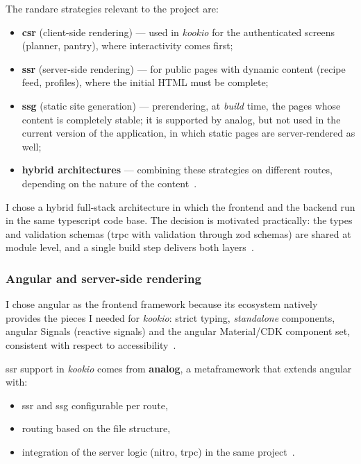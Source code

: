 The \gls{randare} strategies relevant to the project are:
\begin{itemize}
  \item \textbf{\acrshort{csr}} (client-side rendering) --- used in \textit{\gls{kookio}} for the authenticated screens (planner, pantry), where interactivity comes first;
  \item \textbf{\acrshort{ssr}} (server-side rendering) --- for public pages with dynamic content (recipe feed, profiles), where the initial HTML must be complete;
  \item \textbf{\acrshort{ssg}} (static site generation) --- prerendering, at \textit{build} time, the pages whose content is completely stable; it is supported by \gls{analog}, but not used in the current version of the application, in which static pages are server-rendered as well;
  \item \textbf{hybrid architectures} --- combining these strategies on different routes, depending on the nature of the content~\cite{analog}.
\end{itemize}

I chose a hybrid full-stack architecture in which the frontend and the backend run in the same \gls{typescript} code base.
The decision is motivated practically: the types and validation schemas (\gls{trpc} with validation through \gls{zod} schemas) are shared at module level, and a single build step delivers both layers~\cite{trpc,zod}.

\subsubsection{Angular and server-side rendering}\label{subsec:angular-ssr}

I chose \gls{angular} as the frontend framework because its ecosystem natively provides the pieces I needed for \textit{\gls{kookio}}: strict typing, \textit{standalone} components, \gls{angular} Signals (reactive signals) and the \gls{angular} Material/CDK component set, consistent with respect to accessibility~\cite{angular_signals,angular_material}.

\acrshort{ssr} support in \textit{\gls{kookio}} comes from \textbf{\gls{analog}}, a \gls{metaframework} that extends \gls{angular} with:
\begin{itemize}
  \item \acrfull{ssr} and \acrfull{ssg} configurable per route,
  \item routing based on the file structure,
  \item integration of the server logic (\gls{nitro}, \gls{trpc}) in the same project~\cite{analog,analog_routing,nitro}.
\end{itemize}

